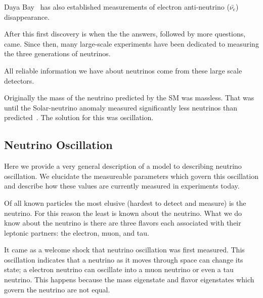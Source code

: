 Daya Bay~\citep{daya_bay_2012_neutrino_PhysRevLett.108.171803} has also established measurements of electron anti-neutrino ($\bar{\nu_{e}}$) disappearance.

After this first discovery is when the the answers, followed by more questions, came.
Since then, many large-scale experiments have been dedicated to measuring the three generations of neutrinos.
~\citep{SNO_2002_neutrino_PhysRevLett.89.011301,
neutrino_measurement_NOvA_2019_prl,
t2k_2011_neutrino_PhysRevLett.107.041801,
reno_2012_neutrino_PhysRevLett.108.191802,
FUKUDA2002_solar_neutrino_oscillation,
kamland_2003_neutrino_PhysRevLett.90.021802,
daya_bay_2012_neutrino_PhysRevLett.108.171803,
doubleChooz_2012_neutrino_PhysRevLett.108.131801}

All reliable information we have about neutrinos come from these large scale detectors.

Originally the mass of the neutrino predicted by the SM was massless.
That was until the Solar-neutrino anomaly measured significantly less neutrinos than predicted~\citep{solar_neutrino_problem_PhysRevLett.20.1205}.
The solution for this was oscillation.


\subsection{Neutrino Oscillation}

Here we provide a very general description of a model to describing neutrino oscillation.
We elucidate the measureable parameters which govern this oscillation and describe how these values are currently measured in experiments today.

Of all known particles the most elusive (hardest to detect and measure) is the neutrino.
For this reason the least is known about the neutrino.
What we do know about the neutrino is there are three flavors each associated with their leptonic partners: the electron, muon, and tau.

It came as a welcome shock that neutrino oscillation was first measured.
This oscillation indicates that a neutrino as it moves through space can change its state; a electron neutrino can oscillate into a muon neutrino or even a tau neutrino.
This happens because the mass eigenstate and flavor eigenstates which govern the neutrino are not equal.

